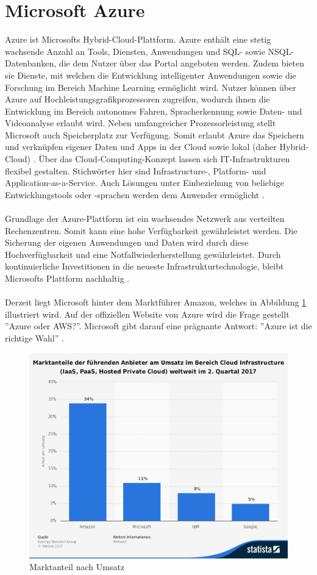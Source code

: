 \section{Microsoft Azure}
Azure ist Microsofts Hybrid-Cloud-Plattform. Azure enthält eine stetig wachsende Anzahl an Tools, Diensten, Anwendungen und SQL- sowie NSQL-Datenbanken, die dem Nutzer über das Portal angeboten werden. Zudem bieten sie Dienste, mit welchen die Entwicklung intelligenter Anwendungen sowie die Forschung im Bereich Machine Learning ermöglicht wird. Nutzer können über Azure auf Hochleistungsgrafikprozessoren zugreifen, wodurch ihnen die Entwicklung im Bereich autonomes Fahren, Spracherkennung sowie Daten- und Videoanalyse erlaubt wird. Neben umfangreicher Prozessorleistung stellt Microsoft auch Speicherplatz zur Verfügung. Somit erlaubt Azure das Speichern und verknüpfen eigener Daten und Apps in der Cloud sowie lokal (daher Hybrid-Cloud) \cite{Sicherheit.2017b}. Über das Cloud-Computing-Konzept lassen sich IT-Infrastrukturen flexibel gestalten. Stichwörter hier sind Infrastructure-, Platform- und Application-as-a-Service. Auch Lösungen unter Einbeziehung von beliebige Entwicklungstools oder -sprachen werden dem Anwender ermöglicht \cite{Klein.2017}. \\ \\ 
Grundlage der Azure-Plattform ist ein wachsendes Netzwerk aus verteilten Rechenzentren. Somit kann eine hohe Verfügbarkeit gewährleistet werden. Die Sicherung der eigenen Anwendungen und Daten wird durch diese Hochverfügbarkeit und eine Notfallwiederherstellung gewährleistet. Durch kontinuierliche Investitionen in die neueste Infrastrukturtechnologie, bleibt Microsofts Plattform nachhaltig \cite{Klein.2017}.\\ \\
Derzeit liegt Microsoft hinter dem Marktführer Amazon, welches in Abbildung \ref{fig:statistik} illustriert wird. Auf der offiziellen Website von Azure wird die Frage gestellt ''Azure oder AWS?''. Microsoft gibt darauf eine prägnante Antwort: ''Azure ist die richtige Wahl'' \cite{Microsoft.2017}.
\begin{figure}[ht!]
	\centering
	\includegraphics[width=1.0\linewidth]{images/statistik}
	\caption{Marktanteil nach Umsatz \cite{Statista.2017b}} %
	\label{fig:statistik}
\end{figure}
